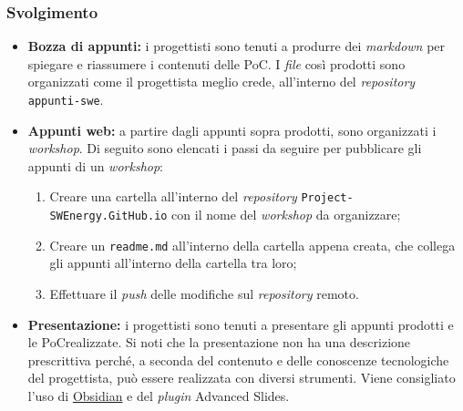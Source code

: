 \subsubsection{Svolgimento}
\begin{itemize}
	\item \textbf{Bozza di appunti:} i progettisti sono tenuti a produrre dei
	      \textit{markdown} per spiegare e riassumere i contenuti delle PoC\g. I
	      \textit{file} così prodotti sono organizzati come il progettista
	      meglio crede, all'interno del \textit{repository\g}
	      \texttt{appunti-swe}.

	\item \textbf{Appunti web:} a partire dagli appunti sopra prodotti, sono
	      organizzati i \textit{workshop}. Di seguito sono elencati i passi da
	      seguire per pubblicare gli appunti di un \textit{workshop}:
	      \begin{enumerate}
		      \item Creare una cartella all'interno del \textit{repository\g}
		            \texttt{Project-SWEnergy.GitHub.io} con il nome del
		            \textit{workshop} da organizzare;

		      \item Creare un \texttt{readme.md} all'interno della
		            cartella appena creata, che collega gli appunti all'interno
		            della cartella tra loro;

		      \item Effettuare il \textit{push} delle modifiche sul
		            \textit{repository\g} remoto.
	      \end{enumerate}

	\item \textbf{Presentazione:} i progettisti sono tenuti a presentare gli
	      appunti prodotti e le PoC\g realizzate.
	      Si noti che la presentazione non ha una descrizione prescrittiva
	      perché, a seconda del contenuto e delle conoscenze tecnologiche del
	      progettista, può essere realizzata con diversi strumenti. Viene
	      consigliato l'uso di \href{https://obsidian.md/}{Obsidian} e
	      del \textit{plugin} Advanced Slides.
\end{itemize}
